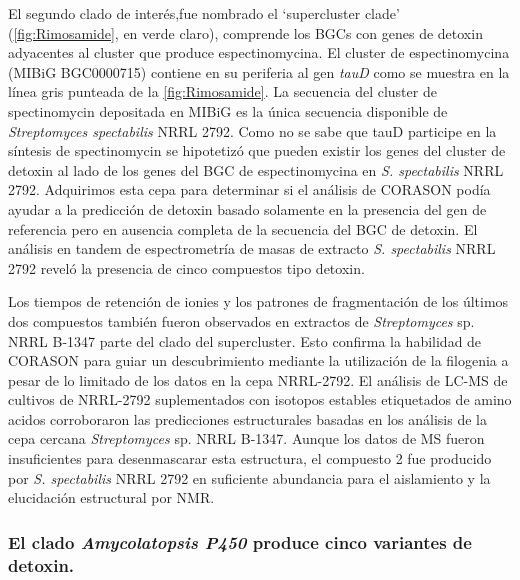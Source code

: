 \documentclass[12pt,twoside]{reedthesis}
\begin{document}
  El segundo clado de interés,fue nombrado el `supercluster clade'
  (\autoref{fig:Rimosamide}, en verde claro), comprende los BGCs con genes
  de detoxin adyacentes al cluster que produce espectinomycina. El cluster
  de espectinomycina (MIBiG BGC0000715) contiene en su periferia al gen
  \emph{tauD} como se muestra en la línea gris punteada de la
  \autoref{fig:Rimosamide}. La secuencia del cluster de spectinomycin
  depositada en MIBiG es la única secuencia disponible de
  \emph{Streptomyces spectabilis} NRRL 2792. Como no se sabe que tauD
  participe en la síntesis de spectinomycin se hipotetizó que pueden
  existir los genes del cluster de detoxin al lado de los genes del BGC de
  espectinomycina en \emph{S. spectabilis} NRRL 2792. Adquirimos esta cepa
  para determinar si el análisis de CORASON podía ayudar a la predicción
  de detoxin basado solamente en la presencia del gen de referencia pero
  en ausencia completa de la secuencia del BGC de detoxin. El análisis en
  tandem de espectrometría de masas de extracto \emph{S. spectabilis} NRRL
  2792 reveló la presencia de cinco compuestos tipo detoxin.
  
  Los tiempos de retención de ionies y los patrones de fragmentación de
  los últimos dos compuestos también fueron observados en extractos de
  \emph{Streptomyces} sp. NRRL B-1347 parte del clado del supercluster.
  Esto confirma la habilidad de CORASON para guiar un descubrimiento
  mediante la utilización de la filogenia a pesar de lo limitado de los
  datos en la cepa NRRL-2792. El análisis de LC-MS de cultivos de
  NRRL-2792 suplementados con isotopos estables etiquetados de amino
  acidos corroboraron las predicciones estructurales basadas en los
  análisis de la cepa cercana \emph{Streptomyces} sp. NRRL B-1347. Aunque
  los datos de MS fueron insuficientes para desenmascarar esta estructura,
  el compuesto 2 fue producido por \emph{S. spectabilis} NRRL 2792 en
  suficiente abundancia para el aislamiento y la elucidación estructural
  por NMR.
  
  \subsubsection{\texorpdfstring{El clado \emph{Amycolatopsis P450}
  produce cinco variantes de
  detoxin.}{El clado Amycolatopsis P450 produce cinco variantes de detoxin.}}\label{el-clado-amycolatopsis-p450-produce-cinco-variantes-de-detoxin.}
  
\end{document}
